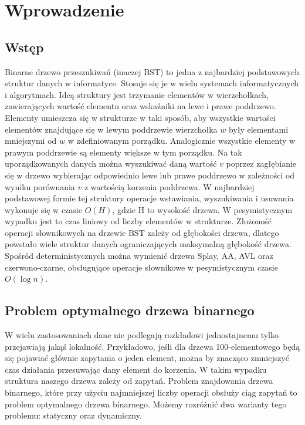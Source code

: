 \documentclass[declaration,shortabstract]{iithesis}
\author         {Julia Majkowska}
\theoremstyle{thm}
\theoremstyle{remark}
\theoremstyle{plain}
\theoremstyle{plain}
\theoremstyle{plain}
\begin{document}

  

\chapter{Wprowadzenie}   

\section{Wstęp}   

Binarne drzewo przeszukiwań (inaczej BST) to jedna z najbardziej podstawowych struktur danych w informatyce. Stosuje się je w wielu systemach informatycznych i algorytmach. Ideą struktury jest trzymanie elementów w wierzchołkach, zawierających wartość elementu oraz wskaźniki na lewe i prawe poddrzewo. Elementy umieszcza się w strukturze w taki sposób, aby wszystkie wartości elementów znajdujące się w lewym poddrzewie wierzchołka \(w\) były elementami mniejszymi od \(w\) w zdefiniowanym porządku. Analogicznie wszystkie elementy w prawym poddrzewie są elementy większe w tym porządku. Na tak uporządkowanych danych można wyszukiwać daną wartość \(v\) poprzez zagłębianie się w drzewo wybierając odpowiednio lewe lub prawe poddrzewo w zależności od wyniku porównania \(v\) z wartością korzenia poddrzewa. W najbardziej podstawowej formie tej struktury operacje wstawiania, wyszukiwania i usuwania wykonuje się w czasie \(O(H)\), gdzie H to wysokość drzewa. W pesymistycznym wypadku jest to czas liniowy od liczby elementów w strukturze. Złożoność operacji słownikowych na drzewie BST zależy od głębokości drzewa, dlatego powstało wiele struktur danych ograniczających maksymalną głębokość drzewa. Spośród deterministycznych można wymienić drzewa Splay, AA, AVL oraz czerwono-czarne, obsługujące operacje słownikowe w pesymistycznym czasie \(O(\log n)\).   

 

\section{Problem optymalnego drzewa binarnego}   

W wielu zastosowaniach dane nie podlegają rozkładowi jednostajnemu tylko przejawiają jakąś lokalność. Przykładowo, jeśli dla drzewa 100-elementowego będą się pojawiać głównie zapytania o jeden element, można by znacząco zmniejszyć czas działania przesuwając dany element do korzenia. W takim wypadku struktura naszego drzewa zależy od zapytań. Problem znajdowania drzewa binarnego, które przy użyciu najmniejszej liczby operacji obsłuży ciąg zapytań to problem optymalnego drzewa binarnego. Możemy rozróżnić dwa warianty tego problemu: statyczny oraz dynamiczny.   
\end{document}

